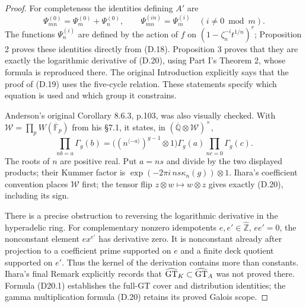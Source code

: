 \begin{proof}
For completeness the identities defining $A'$ are
\[
 \Psi_{mn}^{(0)}=\Psi_m^{(0)}+\Psi_n^{(0)},\qquad
 \Psi_{mn}^{(in)}=\Psi_m^{(i)}\quad(i\ne0\bmod m).
\]
The functions $\Psi_n^{(i)}$ are defined by the action of $f$ on
$(1-\zeta_n^{-i}t^{1/n})^r$; Proposition 2 proves these identities directly from (D.18). Proposition 3 proves that they are exactly the logarithmic derivative of (D.20), using Part I's Theorem 2, whose formula is reproduced there. The original Introduction explicitly says that the proof of (D.19) uses the five-cycle relation. These statements specify which equation is used and which group it constrains.

Anderson's original Corollary 8.6.3, p.103, was also visually
checked. With $\mathcal W=\prod_pW(\overline{\mathbb F}_p)$
from his \S7.1, it states, in
$(\overline{\mathbb Q}\otimes\mathcal W)^\times$,
\[
 \prod_{nb=a}\Gamma_g(b)=
 \bigl((n^{\langle-a\rangle})^{g-1}\otimes1\bigr)
 \Gamma_g(a)\prod_{nc=0}\Gamma_g(c).
\]
The roots of $n$ are positive real. Put $a=ns$ and divide
by the two displayed products; their Kummer factor is
$\exp(-2\pi i\,ns\kappa_n(g))\otimes1$.
Ihara's coefficient convention places $\mathcal W$ first;
the tensor flip $z\otimes w\mapsto w\otimes z$ gives exactly
(D.20), including its sign.

There is a precise obstruction to reversing the logarithmic derivative in the hyperadelic ring. For complementary nonzero idempotents $e,e'\in\widehat{\mathbb Z}$, $ee'=0$, the nonconstant element $e x^{e'}$ has derivative zero. It is nonconstant already after projection to a coefficient prime supported on $e$ and a finite deck quotient supported on $e'$. Thus the kernel of the derivation contains more than constants. Ihara's final Remark explicitly records that $\widehat{\rm GT}_K\subset\widehat{\rm GT}_A$ was not proved there. Formula (D20.1) establishes the full-GT cover and distribution identities; the gamma multiplication formula (D.20) retains its proved Galois scope.
\end{proof}

